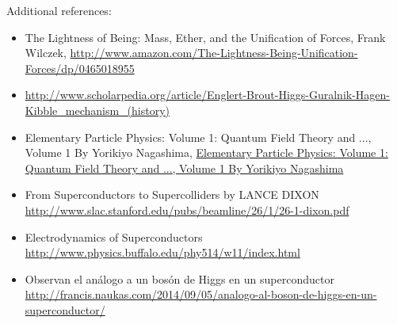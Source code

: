 Additional references:
\begin{itemize}
\item The Lightness of Being: Mass, Ether, and the Unification of Forces,
Frank Wilczek, \url{http://www.amazon.com/The-Lightness-Being-Unification-Forces/dp/0465018955}
\item \url{http://www.scholarpedia.org/article/Englert-Brout-Higgs-Guralnik-Hagen-Kibble_mechanism_(history)}
\item Elementary Particle Physics: Volume 1: Quantum Field Theory and ..., Volume 1
 By Yorikiyo Nagashima, \url{Elementary Particle Physics: Volume 1: Quantum Field Theory and ..., Volume 1
 By Yorikiyo Nagashima}
\item From Superconductors 
to Supercolliders
by LANCE DIXON \url{http://www.slac.stanford.edu/pubs/beamline/26/1/26-1-dixon.pdf}
\item Electrodynamics of Superconductors \url{http://www.physics.buffalo.edu/phy514/w11/index.html}
\item Observan el análogo a un bosón de Higgs en un superconductor \url{http://francis.naukas.com/2014/09/05/analogo-al-boson-de-higgs-en-un-superconductor/}
\end{itemize}



